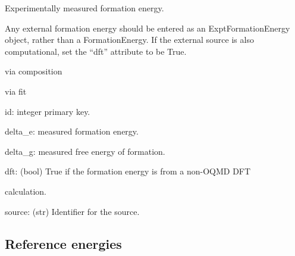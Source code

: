 \documentclass[letterpaper,10pt,english]{sphinxmanual}
\begin{document}
\begin{fulllineitems}
\label{models:qmpy.ExptFormationEnergy}
Experimentally measured formation energy.

Any external formation energy should be entered as an ExptFormationEnergy
object, rather than a FormationEnergy. If the external source is also
computational, set the ``dft'' attribute to be True.
\begin{description}
\item[{Relationships:}] \leavevmode
\begin{DUlineblock}{0em}
\item[] {\hyperref[models:qmpy.Composition]{}} via composition
\item[] {\hyperref[models:qmpy.Fit]{}} via fit
\end{DUlineblock}

\item[{Attributes:}] \leavevmode
\begin{DUlineblock}{0em}
\item[] id: integer primary key.
\item[] delta\_e: measured formation energy.
\item[] delta\_g: measured free energy of formation.
\item[] dft: (bool) True if the formation energy is from a non-OQMD DFT
\item[]
\begin{DUlineblock}{\DUlineblockindent}
\item[] calculation.
\end{DUlineblock}
\item[] source: (str) Identifier for the source.
\end{DUlineblock}

\end{description}

\end{fulllineitems}



\subsection{Reference energies}
\label{models:reference-energies}
\end{document}
